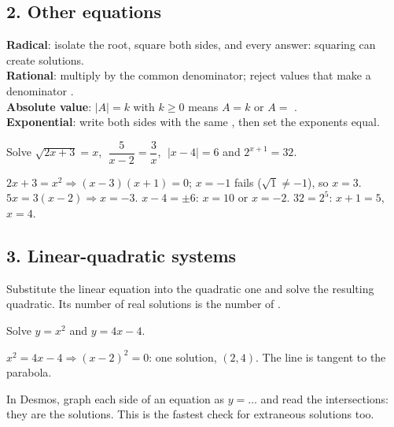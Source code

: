 \subsection*{2. Other equations}
\begin{keyidea}
\textbf{Radical}: isolate the root, square both sides, and  every answer: squaring can create  solutions.\\
\textbf{Rational}: multiply by the common denominator; reject values that make a denominator .\\
\textbf{Absolute value}: $|A|=k$ with $k\ge0$ means $A=k$ or $A=$ .\\
\textbf{Exponential}: write both sides with the same , then set the exponents equal.
\end{keyidea}

Solve $\sqrt{2x+3}=x$, $\;\dfrac{5}{x-2}=\dfrac3x$, $\;|x-4|=6$ and $2^{x+1}=32$.
\begin{workspace}[3cm]
$2x+3=x^2 \Rightarrow (x-3)(x+1)=0$; $x=-1$ fails ($\sqrt1\neq-1$), so $x=3$.\\
$5x=3(x-2) \Rightarrow x=-3$. \quad $x-4=\pm6$: $x=10$ or $x=-2$. \quad $32=2^5$: $x+1=5$, $x=4$.
\end{workspace}

\subsection*{3. Linear-quadratic systems}
\begin{keyidea}
Substitute the linear equation into the quadratic one and solve the resulting quadratic. Its number of real solutions is the number of .
\end{keyidea}

Solve $y=x^2$ and $y=4x-4$.
\begin{workspace}[1.8cm]
$x^2=4x-4 \Rightarrow (x-2)^2=0$: one solution, $(2,4)$. The line is tangent to the parabola.
\end{workspace}

\begin{aptip}
In Desmos, graph each side of an equation as $y=\dots$ and read the intersections: they are the solutions. This is the fastest check for extraneous solutions too.
\end{aptip}

